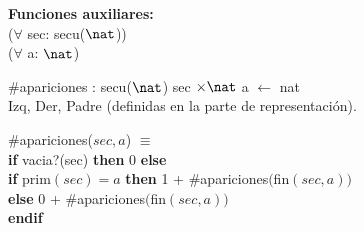 \documentclass[../main.tex]{subfiles}
\begin{document}
\begin{interfaz}
{\large\bfseries Funciones auxiliares: } \\
($\forall$ sec: secu($\nat$)) \\
($\forall$ a: $\nat$)

\#apariciones : secu($\nat$) sec $\times \nat$ a $\longleftarrow$ nat\\
Izq, Der, Padre (definidas en la parte de representación).

$\#$apariciones($sec, a$) $\equiv$ \\
\textbf{if} vacia?(sec) \textbf{then} 0 \textbf{else} \\
 \textbf{if} prim$(sec) = a$ \textbf{then} 1 + $\#$apariciones$($fin$(sec, a))$ \\
 \textbf{else} 0 + $\#$apariciones$($fin$(sec, a))$ \\
\textbf{endif}
\end{interfaz}
\end{document}
